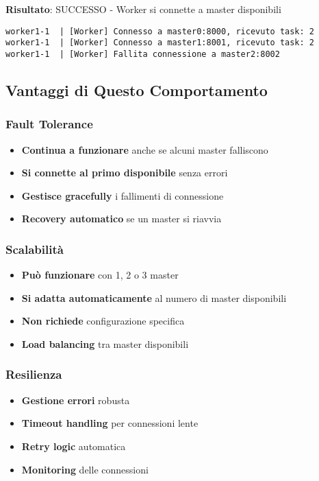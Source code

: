 \documentclass[12pt,a4paper]{article}
\begin{document}
\textbf{Risultato}: SUCCESSO - Worker si connette a master disponibili
\begin{lstlisting}
worker1-1  | [Worker] Connesso a master0:8000, ricevuto task: 2
worker1-1  | [Worker] Connesso a master1:8001, ricevuto task: 2
worker1-1  | [Worker] Fallita connessione a master2:8002
\end{lstlisting}

\subsection{Vantaggi di Questo Comportamento}

\subsubsection{Fault Tolerance}

\begin{itemize}
\item \textbf{Continua a funzionare} anche se alcuni master falliscono
\item \textbf{Si connette al primo disponibile} senza errori
\item \textbf{Gestisce gracefully} i fallimenti di connessione
\item \textbf{Recovery automatico} se un master si riavvia
\end{itemize}

\subsubsection{Scalabilità}

\begin{itemize}
\item \textbf{Può funzionare} con 1, 2 o 3 master
\item \textbf{Si adatta automaticamente} al numero di master disponibili
\item \textbf{Non richiede} configurazione specifica
\item \textbf{Load balancing} tra master disponibili
\end{itemize}

\subsubsection{Resilienza}

\begin{itemize}
\item \textbf{Gestione errori} robusta
\item \textbf{Timeout handling} per connessioni lente
\item \textbf{Retry logic} automatica
\item \textbf{Monitoring} delle connessioni
\end{itemize}
\end{document}
